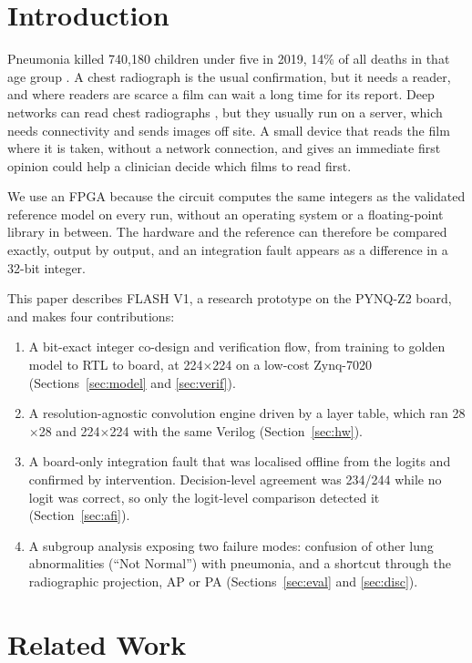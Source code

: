 \documentclass[conference]{IEEEtran}
\begin{document}
\section{Introduction}

Pneumonia killed 740,180 children under five in 2019, 14\% of all deaths in that age group
\cite{who2022pneumonia}. A chest radiograph is the usual confirmation, but it needs a reader,
and where readers are scarce a film can wait a long time for its report. Deep networks can read
chest radiographs \cite{wang2017chestxray8,rajpurkar2017chexnet}, but they usually run on a
server, which needs connectivity and sends images off site. A small device that reads the film
where it is taken, without a network connection, and gives an immediate first opinion could help
a clinician decide which films to read first.

We use an FPGA because the circuit computes the same integers as the validated reference model
on every run, without an operating system or a floating-point library in between. The hardware
and the reference can therefore be compared exactly, output by output, and an integration fault
appears as a difference in a 32-bit integer.

This paper describes FLASH V1, a research prototype on the PYNQ-Z2 board, and makes four
contributions:
\begin{enumerate}
\item A bit-exact integer co-design and verification flow, from training to golden model to RTL
to board, at 224$\times$224 on a low-cost Zynq-7020 (Sections~\ref{sec:model} and
\ref{sec:verif}).
\item A resolution-agnostic convolution engine driven by a layer table, which ran 28$\times$28
and 224$\times$224 with the same Verilog (Section~\ref{sec:hw}).
\item A board-only integration fault that was localised offline from the logits and confirmed by
intervention. Decision-level agreement was 234/244 while no logit was correct, so only the
logit-level comparison detected it (Section~\ref{sec:afi}).
\item A subgroup analysis exposing two failure modes: confusion of other lung abnormalities
(``Not Normal'') with pneumonia, and a shortcut through the radiographic projection, AP or PA
(Sections~\ref{sec:eval} and \ref{sec:disc}).
\end{enumerate}

\section{Related Work}
\end{document}
